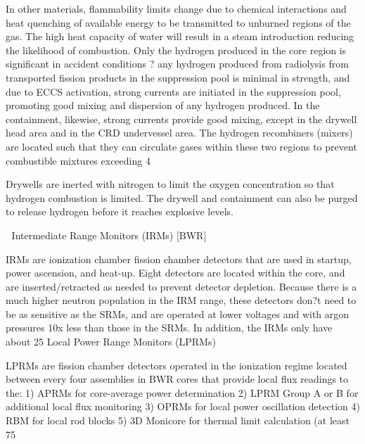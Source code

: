 \documentclass[10pt]{article}
\begin{document}
In other materials, flammability limits change due to chemical interactions and heat quenching of available energy to be transmitted to unburned regions of the gas. The high heat capacity of water will result in a steam introduction reducing the likelihood of combustion. Only the hydrogen produced in the core region is significant in accident conditions ? any hydrogen produced from radiolysis from transported fission products in the suppression pool is minimal in strength, and due to ECCS activation, strong currents are initiated in the suppression pool, promoting good mixing and dispersion of any hydrogen produced. In the containment, likewise, strong currents provide good mixing, except in the drywell head area and in the CRD undervessel area. The hydrogen recombiners (mixers) are located such that they can circulate gases within these two regions to prevent combustible mixtures exceeding 4%

Drywells are inerted with nitrogen to limit the oxygen concentration so that hydrogen combustion is limited. The drywell and containment can also be purged to release hydrogen before it reaches explosive levels. 


 




Intermediate Range Monitors (IRMs) [BWR]

IRMs are ionization chamber fission chamber detectors that are used in startup, power ascension, and heat-up. Eight detectors are located within the core, and are inserted/retracted as needed to prevent detector depletion. Because there is a much higher neutron population in the IRM range, these detectors don?t need to be as sensitive as the SRMs, and are operated at lower voltages and with argon pressures 10x less than those in the SRMs. In addition, the IRMs only have about 25%
Local Power Range Monitors (LPRMs)

LPRMs are fission chamber detectors operated in the ionization regime located between every four assemblies in BWR cores that provide local flux readings to the:
1)	APRMs for core-average power determination
2)	LPRM Group A or B for additional local flux monitoring
3)	OPRMs for local power oscillation detection
4)	RBM for local rod blocks
5)	3D Monicore for thermal limit calculation (at least 75%
\end{document}
